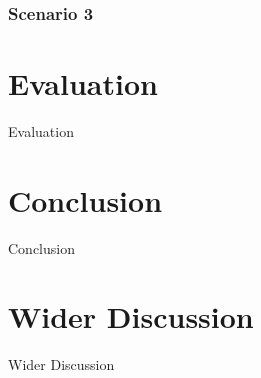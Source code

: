 \documentclass{article}
\begin{document}
\subsubsection{Scenario 3}

\section{Evaluation}
Evaluation

\section{Conclusion}
Conclusion

\section{Wider Discussion}
Wider Discussion
\end{document}
